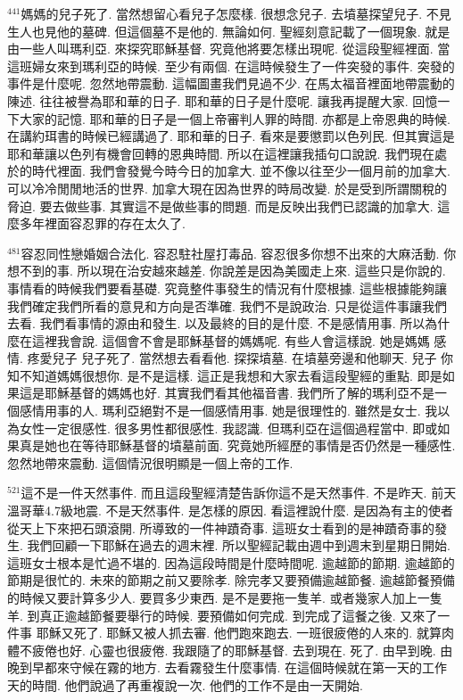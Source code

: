 \documentclass{book}
\begin{document}
$^{441}$媽媽的兒子死了.
當然想留心看兒子怎麼樣.
很想念兒子.
去墳墓探望兒子.
不見生人也見他的墓碑.
但這個墓不是他的.
無論如何.
聖經刻意記載了一個現象.
就是由一些人叫瑪利亞.
來探究耶穌基督.
究竟他將要怎樣出現呢.
從這段聖經裡面.
當這班婦女來到瑪利亞的時候.
至少有兩個.
在這時候發生了一件突發的事件.
突發的事件是什麼呢.
忽然地帶震動.
這幅圖畫我們見過不少.
在馬太福音裡面地帶震動的陳述.
往往被譽為耶和華的日子.
耶和華的日子是什麼呢.
讓我再提醒大家.
回憶一下大家的記憶.
耶和華的日子是一個上帝審判人罪的時間.
亦都是上帝恩典的時候.
在講約珥書的時候已經講過了.
耶和華的日子.
看來是要懲罰以色列民.
但其實這是耶和華讓以色列有機會回轉的恩典時間.
所以在這裡讓我插句口說說.
我們現在處於的時代裡面.
我們會發覺今時今日的加拿大.
並不像以往至少一個月前的加拿大.
可以冷冷閒閒地活的世界.
加拿大現在因為世界的時局改變.
於是受到所謂關稅的脅迫.
要去做些事.
其實這不是做些事的問題.
而是反映出我們已認識的加拿大.
這麼多年裡面容忍罪的存在太久了.

$^{481}$容忍同性戀婚姻合法化.
容忍駐社屋打毒品.
容忍很多你想不出來的大麻活動.
你想不到的事.
所以現在治安越來越差.
你說差是因為美國走上來.
這些只是你說的.
事情看的時候我們要看基礎.
究竟整件事發生的情況有什麼根據.
這些根據能夠讓我們確定我們所看的意見和方向是否準確.
我們不是說政治.
只是從這件事讓我們去看.
我們看事情的源由和發生.
以及最終的目的是什麼.
不是感情用事.
所以為什麼在這裡我會說.
這個會不會是耶穌基督的媽媽呢.
有些人會這樣說.
她是媽媽 感情.
疼愛兒子 兒子死了.
當然想去看看他.
探探墳墓.
在墳墓旁邊和他聊天.
兒子 你知不知道媽媽很想你.
是不是這樣.
這正是我想和大家去看這段聖經的重點.
即是如果這是耶穌基督的媽媽也好.
其實我們看其他福音書.
我們所了解的瑪利亞不是一個感情用事的人.
瑪利亞絕對不是一個感情用事.
她是很理性的.
雖然是女士.
我以為女性一定很感性.
很多男性都很感性.
我認識.
但瑪利亞在這個過程當中.
即或如果真是她也在等待耶穌基督的墳墓前面.
究竟她所經歷的事情是否仍然是一種感性.
忽然地帶來震動.
這個情況很明顯是一個上帝的工作.

$^{521}$這不是一件天然事件.
而且這段聖經清楚告訴你這不是天然事件.
不是昨天.
前天溫哥華4.7級地震.
不是天然事件.
是怎樣的原因.
看這裡說什麼.
是因為有主的使者從天上下來把石頭滾開.
所導致的一件神蹟奇事.
這班女士看到的是神蹟奇事的發生.
我們回顧一下耶穌在過去的週末裡.
所以聖經記載由週中到週末到星期日開始.
這班女士根本是忙過不堪的.
因為這段時間是什麼時間呢.
逾越節的節期.
逾越節的節期是很忙的.
未來的節期之前又要除孝.
除完孝又要預備逾越節餐.
逾越節餐預備的時候又要計算多少人.
要買多少東西.
是不是要拖一隻羊.
或者幾家人加上一隻羊.
到真正逾越節餐要舉行的時候.
要預備如何完成.
到完成了這餐之後.
又來了一件事 耶穌又死了.
耶穌又被人抓去審.
他們跑來跑去.
一班很疲倦的人來的.
就算肉體不疲倦也好.
心靈也很疲倦.
我跟隨了的耶穌基督.
去到現在.
死了.
由早到晚.
由晚到早都來守候在霧的地方.
去看霧發生什麼事情.
在這個時候就在第一天的工作天的時間.
他們說過了再重複說一次.
他們的工作不是由一天開始.
\end{document}

